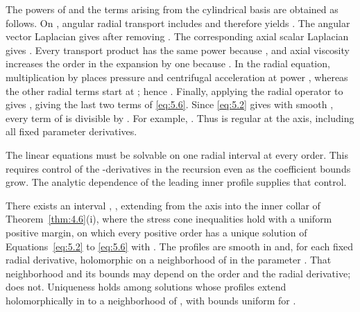 The powers of  and the terms arising from the cylindrical
basis are obtained as follows. On
, angular radial transport
includes  and therefore
yields . The angular
vector Laplacian gives
 after removing
. The corresponding axial scalar
Laplacian gives .
Every transport product has the same power because
, and axial viscosity increases the order in the
 expansion by one because
. In the radial equation, multiplication by
 places pressure and centrifugal acceleration at power
, whereas the other radial terms start
at ; hence
. Finally, applying the radial operator
 to
 gives
, giving the last two terms of
\eqref{eq:5.6}. Since \eqref{eq:5.2} gives
 with smooth , every
term of  is divisible by .
For example,
. Thus  is
regular at the axis, including all fixed parameter derivatives.

The linear equations must be solvable on one radial interval at every order.
This requires control of the -derivatives in the
recursion even as the coefficient bounds grow. The analytic dependence of the
leading inner profile supplies that control.

\begin{lemma}
\label{lem:5.1}
There exists an interval ,
, extending from the axis into the inner collar
of Theorem~\ref{thm:4.6}\textup{(i)}, where the stress cone inequalities hold
with a uniform positive margin, on which every positive order has a unique
solution of Equations~\eqref{eq:5.2} to \eqref{eq:5.6} with
. The profiles
are smooth in  and, for each fixed radial derivative,
holomorphic on a neighborhood of  in the parameter
. That neighborhood and its bounds may depend on the
order and the radial derivative;  does not. Uniqueness
holds among solutions whose profiles extend holomorphically in
 to a neighborhood of ,
with bounds uniform for .
\end{lemma}


